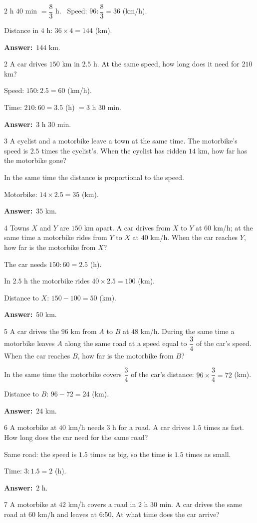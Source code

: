\documentclass[11pt]{article}
\newif\ifsol \solfalse
\providecommand{\AnsWord}{Đáp số}
\newcommand{\dapso}[1]{\par\textbf{\AnsWord:}\ #1}
\newcommand{\probsol}[1]{%
  \begin{lrbox}{\solmeasure}\begin{minipage}{\dimexpr\linewidth-24pt\relax}#1\end{minipage}\end{lrbox}%
  \ifsol
    \begin{solbox}#1\end{solbox}%
  \else
    \setlength{\solht}{\dimexpr\ht\solmeasure+\dp\solmeasure+0.85cm\relax}%
    \ifdim\solht<1.35cm\setlength{\solht}{1.35cm}\fi
    \begin{tcolorbox}[colback=white,colframe=Line,boxrule=0.8pt,arc=5pt,
      left=8pt,right=8pt,top=4pt,bottom=4pt,height=\solht]{\footnotesize\color{Slate}\itshape\WorkWord}\end{tcolorbox}%
  \fi}
\newcommand{\gap}{\vspace{0.3cm}}
\def\WorkWord{Your work:}
\def\AnsWord{Answer}
\begin{document}
\probsol{
$2$ h $40$ min $=\dfrac83$ h. \ Speed: $96:\dfrac83=36$ (km/h).\par Distance in $4$ h: $36\times4=144$ (km).
\dapso{$144$ km.}}
\gap
\begin{probbox}{2}{\relax}
A car drives $150$ km in $2.5$ h. At the same speed, how long does it need for $210$ km?
\end{probbox}
\probsol{
Speed: $150:2.5=60$ (km/h).\par Time: $210:60=3.5$ (h) $=3$ h $30$ min.
\dapso{$3$ h $30$ min.}}
\gap
\begin{probbox}{3}{\relax}
A cyclist and a motorbike leave a town at the same time. The motorbike's speed is $2.5$ times the cyclist's. When the cyclist has ridden $14$ km, how far has the motorbike gone?
\end{probbox}
\probsol{
In the same time the distance is proportional to the speed.\par Motorbike: $14\times2.5=35$ (km).
\dapso{$35$ km.}}
\gap
\begin{probbox}{4}{\relax}
Towns $X$ and $Y$ are $150$ km apart. A car drives from $X$ to $Y$ at $60$ km/h; at the same time a motorbike rides from $Y$ to $X$ at $40$ km/h. When the car reaches $Y$, how far is the motorbike from $X$?
\end{probbox}
\probsol{
The car needs $150:60=2.5$ (h).\par In $2.5$ h the motorbike rides $40\times2.5=100$ (km).\par Distance to $X$: $150-100=50$ (km).
\dapso{$50$ km.}}
\gap
\begin{probbox}{5}{\relax}
A car drives the $96$ km from $A$ to $B$ at $48$ km/h. During the same time a motorbike leaves $A$ along the same road at a speed equal to $\dfrac34$ of the car's speed. When the car reaches $B$, how far is the motorbike from $B$?
\end{probbox}
\probsol{
In the same time the motorbike covers $\dfrac34$ of the car's distance: $96\times\dfrac34=72$ (km).\par Distance to $B$: $96-72=24$ (km).
\dapso{$24$ km.}}
\gap
\begin{probbox}{6}{\relax}
A motorbike at $40$ km/h needs $3$ h for a road. A car drives $1.5$ times as fast. How long does the car need for the same road?
\end{probbox}
\probsol{
Same road: the speed is $1.5$ times as big, so the time is $1.5$ times as small.\par Time: $3:1.5=2$ (h).
\dapso{$2$ h.}}
\gap
\begin{probbox}{7}{\relax}
A motorbike at $42$ km/h covers a road in $2$ h $30$ min. A car drives the same road at $60$ km/h and leaves at 6:50. At what time does the car arrive?
\end{probbox}
\end{document}
